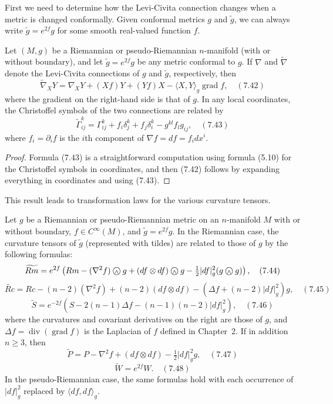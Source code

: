 First we need to determine how the Levi-Civita connection changes when a metric is changed conformally. Given conformal metrics $g$ and $\tilde{g}$, we can always write $\tilde{g} = e^{2f} g$ for some smooth real-valued function $f$.

\begin{proposition}
\label{prop:conformal-transformation-levi-civita}
Let $(M, g)$ be a Riemannian or pseudo-Riemannian $n$-manifold (with or without boundary), and let $\tilde{g} = e^{2f} g$ be any metric conformal to $g$. If $\nabla$ and $\tilde{\nabla}$ denote the Levi-Civita connections of $g$ and $\tilde{g}$, respectively, then
\[
\tilde{\nabla}_X Y = \nabla_X Y + (Xf)Y + (Yf)X - \langle X, Y \rangle_g \operatorname{grad} f, \quad (7.42)
\]
where the gradient on the right-hand side is that of $g$. In any local coordinates, the Christoffel symbols of the two connections are related by
\[
\tilde{\Gamma}^k_{ij} = \Gamma^k_{ij} + f_i \delta^k_j + f_j \delta^k_i - g^{kl} f_l g_{ij}, \quad (7.43)
\]
where $f_i = \partial_i f$ is the $i$th component of $\nabla f = df = f_i dx^i$.
\end{proposition}

\begin{proof}
Formula (7.43) is a straightforward computation using formula (5.10) for the Christoffel symbols in coordinates, and then (7.42) follows by expanding everything in coordinates and using (7.43).
\end{proof}

This result leads to transformation laws for the various curvature tensors.

\begin{theorem}
\label{thm:conformal-transformation-curvature}
Let $g$ be a Riemannian or pseudo-Riemannian metric on an $n$-manifold $M$ with or without boundary, $f \in C^\infty(M)$, and $\tilde{g} = e^{2f} g$. In the Riemannian case, the curvature tensors of $\tilde{g}$ (represented with tildes) are related to those of $g$ by the following formulas:
\[
\widetilde{Rm} = e^{2f}\left(Rm - (\nabla^2 f) \owedge g + (df \otimes df) \owedge g - \tfrac{1}{2}|df|^2_g (g \owedge g)\right), \quad (7.44)
\]
\[
\widetilde{Rc} = Rc - (n-2)(\nabla^2 f) + (n-2)(df \otimes df) - (\Delta f + (n-2)|df|^2_g)g, \quad (7.45)
\]
\[
\tilde{S} = e^{-2f}(S - 2(n-1)\Delta f - (n-1)(n-2)|df|^2_g), \quad (7.46)
\]
where the curvatures and covariant derivatives on the right are those of $g$, and $\Delta f = \operatorname{div}(\operatorname{grad} f)$ is the Laplacian of $f$ defined in Chapter~2. If in addition $n \geq 3$, then
\[
\tilde{P} = P - \nabla^2 f + (df \otimes df) - \tfrac{1}{2}|df|^2_g g, \quad (7.47)
\]
\[
\tilde{W} = e^{2f} W. \quad (7.48)
\]
In the pseudo-Riemannian case, the same formulas hold with each occurrence of $|df|^2_g$ replaced by $\langle df, df \rangle_{g}$.
\end{theorem}

